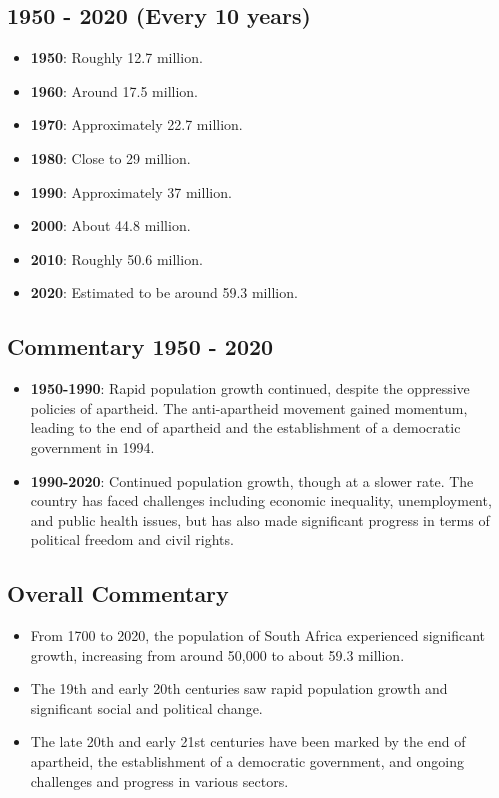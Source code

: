 \subsection*{1950 - 2020 (Every 10 years)}
\begin{itemize}
    \item \textbf{1950}: Roughly 12.7 million.
    \item \textbf{1960}: Around 17.5 million.
    \item \textbf{1970}: Approximately 22.7 million.
    \item \textbf{1980}: Close to 29 million.
    \item \textbf{1990}: Approximately 37 million.
    \item \textbf{2000}: About 44.8 million.
    \item \textbf{2010}: Roughly 50.6 million.
    \item \textbf{2020}: Estimated to be around 59.3 million.
\end{itemize}

\subsection*{Commentary 1950 - 2020}
\begin{itemize}
    \item \textbf{1950-1990}: Rapid population growth continued, despite the oppressive policies of apartheid. The anti-apartheid movement gained momentum, leading to the end of apartheid and the establishment of a democratic government in 1994.
    \item \textbf{1990-2020}: Continued population growth, though at a slower rate. The country has faced challenges including economic inequality, unemployment, and public health issues, but has also made significant progress in terms of political freedom and civil rights.
\end{itemize}

\subsection*{Overall Commentary}
\begin{itemize}
    \item From 1700 to 2020, the population of South Africa experienced significant growth, increasing from around 50,000 to about 59.3 million.
    \item The 19th and early 20th centuries saw rapid population growth and significant social and political change.
    \item The late 20th and early 21st centuries have been marked by the end of apartheid, the establishment of a democratic government, and ongoing challenges and progress in various sectors.
\end{itemize}